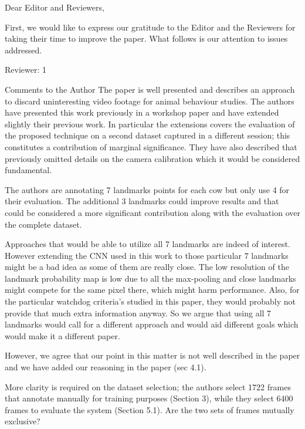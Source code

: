 \documentclass[10pt,a4paper]{letter}
\begin{document}
 
\begin{letter}{} 
\opening{Dear Editor and Reviewers,} 
 
First, we would like to express our gratitude to the Editor and the Reviewers for taking their time to
improve the paper. What follows is our attention to issues addressed.


\begin{siderules}
Reviewer: 1

Comments to the Author
The paper is well presented and describes an approach to discard uninteresting video footage for animal behaviour studies. 
The authors have presented this work previously in a workshop paper and have extended slightly their previous work. 
In particular the extensions covers the evaluation of the proposed technique on a second dataset captured in a different session; 
this constitutes a contribution of marginal significance. 
They have also described that previously omitted details on the camera calibration which it would be considered fundamental.

The authors are annotating 7 landmarks points for each cow but only use 4 for their evaluation. The additional 3 landmarks could improve 
results and that could be considered a more significant contribution along with the evaluation over the complete dataset.
\end{siderules}

Approaches that would be able to utilize all 7 landmarks are indeed of interest. However extending the CNN
used in this work to those particular 7 landmarks might be a bad idea as some of them are really close. The low 
resolution of the landmark probability map is low due
to all the max-pooling and close landmarks might compete for the same pixel there, which might harm performance. 
Also, for the particular watchdog criteria's 
studied in this paper, they would probably not provide that much extra information anyway. So we argue that using all 7 landmarks 
would call for a different approach and would aid different goals which would make it a different paper.

However, we agree that our point in this matter is not well described in the paper and we have added our reasoning in the paper (sec 4.1).

\begin{siderules}
More clarity is required on the dataset selection; the authors select 1722 frames that annotate manually for training purposes (Section 3), 
while they select 6400 frames to evaluate the system (Section 5.1). Are the two sets of frames mutually exclusive?
\end{siderules}


\end{letter}
\end{document}
